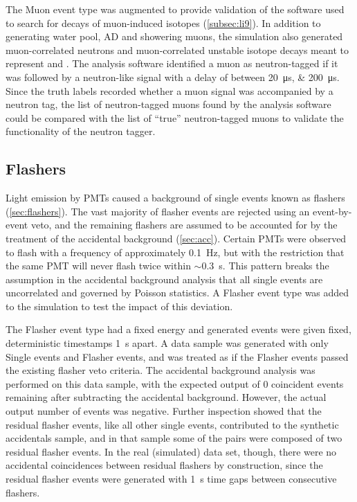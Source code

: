 The Muon event type was augmented to provide validation
of the software used to search for decays of muon-induced isotopes
(\cref{subsec:li9}).
In addition to generating water pool, AD and showering muons,
the simulation also generated muon-correlated neutrons
and muon-correlated unstable isotope decays
meant to represent \li{} and \he.
The analysis software identified a muon as neutron-tagged
if it was followed by a neutron-like signal
with a delay of between \SIlist{20;200}{\us}.
Since the truth labels recorded whether a muon signal
was accompanied by a neutron tag,
the list of neutron-tagged muons found by the analysis software
could be compared with the list of ``true'' neutron-tagged muons
to validate the functionality of the neutron tagger.

\subsection{Flashers}
\label{subsec:toymc_flashers}

Light emission by PMTs caused a background of single events
known as flashers (\cref{sec:flashers}).
The vast majority of flasher events are rejected using an event-by-event veto,
and the remaining flashers are assumed to be accounted for
by the treatment of the accidental background (\cref{sec:acc}).
Certain PMTs were observed to flash with a frequency
of approximately \SI{0.1}{\Hz},
but with the restriction that
the same PMT will never flash twice within $\sim$\SI{0.3}{\s}.
This pattern breaks the assumption in the accidental background analysis
that all single events are uncorrelated and governed by Poisson statistics.
A Flasher event type was added to the simulation to test the impact of this deviation.

The Flasher event type had a fixed energy
and generated events were given fixed, deterministic timestamps \SI{1}{\s} apart.
A data sample was generated with only Single events and Flasher events,
and was treated as if the Flasher events passed the existing flasher veto criteria.
The accidental background analysis was performed on this data sample,
with the expected output of \num{0} coincident events remaining
after subtracting the accidental background.
However, the actual output number of events was negative.
Further inspection showed that the residual flasher events,
like all other single events,
contributed to the synthetic accidentals sample,
and in that sample some of the pairs
were composed of two residual flasher events.
In the real (simulated) data set, though,
there were no accidental coincidences between residual flashers by construction,
since the residual flasher events were generated with \SI{1}{\s} time gaps
between consecutive flashers.

